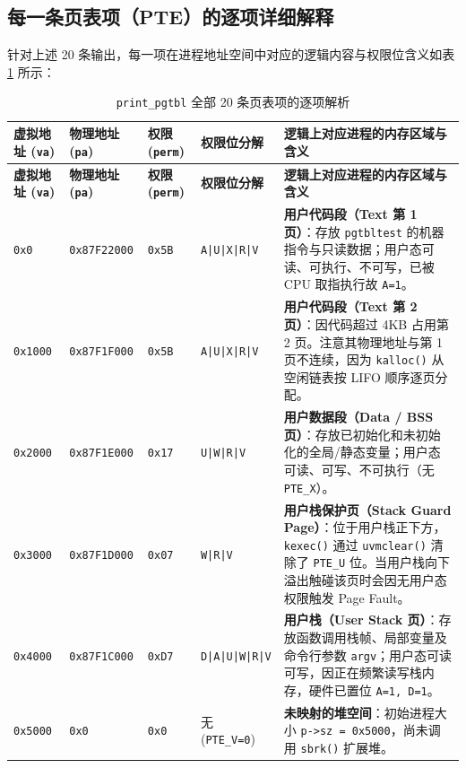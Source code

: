 \documentclass[12pt, a4paper]{ctexart}
\begin{document}
\subsection{每一条页表项（PTE）的逐项详细解释}
针对上述 20 条输出，每一项在进程地址空间中对应的逻辑内容与权限位含义如表 \ref{tab:pgtbl-inspect} 所示：

\begin{longtable}{@{}llllp{6.0cm}@{}}
\caption{\texttt{print\_pgtbl} 全部 20 条页表项的逐项解析}
\label{tab:pgtbl-inspect} \\
\toprule
\textbf{虚拟地址 (\texttt{va})} & \textbf{物理地址 (\texttt{pa})} & \textbf{权限 (\texttt{perm})} & \textbf{权限位分解} & \textbf{逻辑上对应进程的内存区域与含义} \\
\midrule
\endfirsthead
\toprule
\textbf{虚拟地址 (\texttt{va})} & \textbf{物理地址 (\texttt{pa})} & \textbf{权限 (\texttt{perm})} & \textbf{权限位分解} & \textbf{逻辑上对应进程的内存区域与含义} \\
\midrule
\endhead
\texttt{0x0} & \texttt{0x87F22000} & \texttt{0x5B} & \texttt{A|U|X|R|V} & \textbf{用户代码段（Text 第 1 页）}：存放 \texttt{pgtbltest} 的机器指令与只读数据；用户态可读、可执行、不可写，已被 CPU 取指执行故 \texttt{A=1}。 \\
\texttt{0x1000} & \texttt{0x87F1F000} & \texttt{0x5B} & \texttt{A|U|X|R|V} & \textbf{用户代码段（Text 第 2 页）}：因代码超过 4KB 占用第 2 页。注意其物理地址与第 1 页不连续，因为 \texttt{kalloc()} 从空闲链表按 LIFO 顺序逐页分配。 \\
\texttt{0x2000} & \texttt{0x87F1E000} & \texttt{0x17} & \texttt{U|W|R|V} & \textbf{用户数据段（Data / BSS 页）}：存放已初始化和未初始化的全局/静态变量；用户态可读、可写、不可执行（无 \texttt{PTE\_X}）。 \\
\texttt{0x3000} & \texttt{0x87F1D000} & \texttt{0x07} & \texttt{W|R|V} & \textbf{用户栈保护页（Stack Guard Page）}：位于用户栈正下方，\texttt{kexec()} 通过 \texttt{uvmclear()} 清除了 \texttt{PTE\_U} 位。当用户栈向下溢出触碰该页时会因无用户态权限触发 Page Fault。 \\
\texttt{0x4000} & \texttt{0x87F1C000} & \texttt{0xD7} & \texttt{D|A|U|W|R|V} & \textbf{用户栈（User Stack 页）}：存放函数调用栈帧、局部变量及命令行参数 \texttt{argv}；用户态可读可写，因正在频繁读写栈内存，硬件已置位 \texttt{A=1, D=1}。 \\
\texttt{0x5000} & \texttt{0x0} & \texttt{0x0} & 无 (\texttt{PTE\_V=0}) & \textbf{未映射的堆空间}：初始进程大小 \texttt{p->sz = 0x5000}，尚未调用 \texttt{sbrk()} 扩展堆。 \\

\end{longtable}
\end{document}
